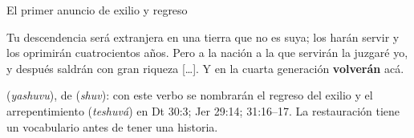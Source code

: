 \begin{frame}{El primer anuncio de exilio y regreso}
\begin{cita}Tu descendencia será extranjera en una tierra que no es suya; los harán servir y los oprimirán cuatrocientos años. Pero a la nación a la que servirán la juzgaré yo, y después saldrán con gran riqueza [\ldots]. Y en la cuarta generación \textbf{volverán} acá.\end{cita}
\centering
{}
\elabpropia
\begin{notalam}
 (\emph{yashuvu}), de  (\emph{shuv}): con este verbo se nombrarán el regreso del exilio y el arrepentimiento (\emph{teshuvá}) en Dt 30:3; Jer 29:14; 31:16--17. La restauración tiene un vocabulario antes de tener una historia.
\end{notalam}
\end{frame}

